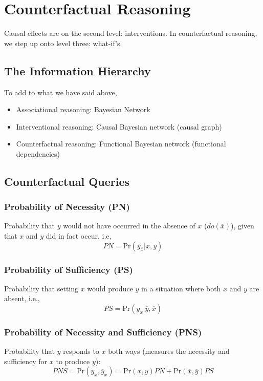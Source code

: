 \documentclass[11pt]{article}
\newcommand{\pr}{\mathrm{Pr}}
\begin{document}
\section{Counterfactual Reasoning}
Causal effects are on the second level: interventions. In counterfactual reasoning, we step up onto level three: what-if's. 

\subsection{The Information Hierarchy}
To add to what we have said above, 
\begin{itemize}
	\item Associational reasoning: Bayesian Network
	\item Interventional reasoning: Causal Bayesian network (causal graph)
	\item Counterfactual reasoning: Functional Bayesian network (functional dependencies)
\end{itemize}

\subsection{Counterfactual Queries}
\subsubsection{Probability of Necessity (PN)}
Probability that $y$ would not have occurred in the absence of $x$ ($do(\overbar x)$), given that $x$ and $y$ did in fact occur, i.e, 
\begin{equation}
	PN = \pr (\overbar y_{\overbar x} | x, y) 
\end{equation}

\subsubsection{Probability of Sufficiency (PS)}
Probability that setting $x$ would produce $y$ in a situation where both $x$ and $y$ are absent, i.e., 
\begin{equation}
	PS = \pr (y_x | \overbar y, \overbar x)
\end{equation}

\subsubsection{Probability of Necessity and Sufficiency (PNS)}
Probability that $y$ responds to $x$ both ways (measures the necessity and sufficiency for $x$ to produce $y$): 
\begin{equation}
	PNS = \pr (y_x, \overbar y_{\overbar x} ) = \pr (x, y) PN + \pr (\overbar x, \overbar y) PS
\end{equation}
\end{document}
